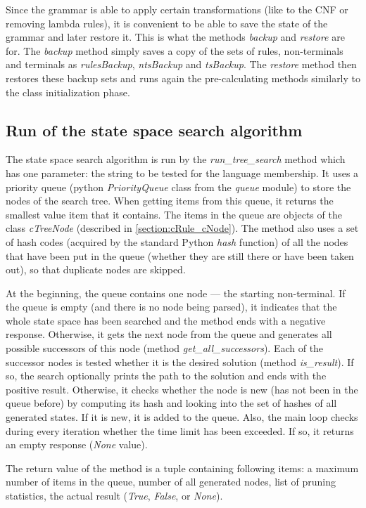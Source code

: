 Since the grammar is able to apply certain transformations (like to the CNF or removing lambda rules), it is convenient to be able to save the state of the grammar and later restore it. This is what the methods \textit{backup} and \textit{restore} are for. The \textit{backup} method simply saves a copy of the sets of rules, non-terminals and terminals as \textit{rulesBackup}, \textit{ntsBackup} and \textit{tsBackup}. The \textit{restore} method then restores these backup sets and runs again the pre-calculating methods similarly to the class initialization phase.

\subsection{Run of the state space search algorithm}
The state space search algorithm is run by the \textit{run\_tree\_search} method which has one parameter: the string to be tested for the language membership. It uses a priority queue (python \textit{PriorityQueue} class from the \textit{queue} module) to store the nodes of the search tree. When getting items from this queue, it returns the smallest value item that it contains. The items in the queue are objects of the class \textit{cTreeNode} (described in \ref{section:cRule_cNode}). The method also uses a set of hash codes (acquired by the standard Python \textit{hash} function) of all the nodes that have been put in the queue (whether they are still there or have been taken out), so that duplicate nodes are skipped.

At the beginning, the queue contains one node --- the starting non-terminal. If the queue is empty (and there is no node being parsed), it indicates that the whole state space has been searched and the method ends with a negative response. Otherwise, it gets the next node from the queue and generates all possible successors of this node (method \textit{get\_all\_successors}). Each of the successor nodes is tested whether it is the desired solution (method \textit{is\_result}). If so, the search optionally prints the path to the solution and ends with the positive result. Otherwise, it checks whether the node is new (has not been in the queue before) by computing its hash and looking into the set of hashes of all generated states. If it is new, it is added to the queue. Also, the main loop checks during every iteration whether the time limit has been exceeded. If so, it returns an empty response (\textit{None} value).

The return value of the method is a tuple containing following items: a maximum number of items in the queue, number of all generated nodes, list of pruning statistics, the actual result (\textit{True}, \textit{False}, or \textit{None}).

